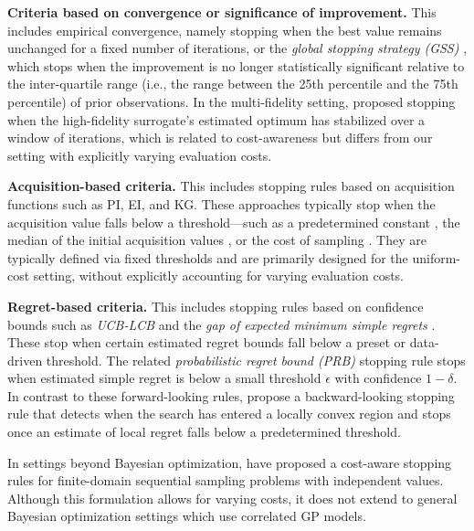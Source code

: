 \textbf{Criteria based on convergence or significance of improvement.} 
This includes empirical convergence, namely stopping when the best value remains unchanged for a fixed number of iterations, or the \emph{global stopping strategy (GSS)} \citep{bakshy2018ae}, which stops when the improvement is no longer statistically significant relative to the inter-quartile range (i.e., the range between the 25th percentile and the 75th percentile) of prior observations.
In the multi-fidelity setting, \citet{FourmaniB25} proposed stopping when the high-fidelity surrogate’s estimated optimum has stabilized over a window of iterations, which is related to cost-awareness but differs from our setting with explicitly varying evaluation costs.

\textbf{Acquisition-based criteria.} This includes stopping rules based on acquisition functions such as PI, EI, and KG. These approaches typically stop when the acquisition value falls below a threshold—such as a predetermined constant \citep{lorenz2015stopping,locatelli1997bayesian}, the median of the initial acquisition values \citep{ishibashi2023stopping}, or the cost of sampling \cite{nguyen2017regret,zhou2024corrected,frazier2008knowledge}. They are typically defined via fixed thresholds and are primarily designed for the uniform-cost setting, without explicitly accounting for varying evaluation costs.

\textbf{Regret-based criteria.} This includes stopping rules based on confidence bounds such as \emph{UCB-LCB} \citep{makarova2022automatic} and the \emph{gap of expected minimum simple regrets} \citep{ishibashi2023stopping}. These stop when certain estimated regret bounds fall below a preset or data-driven threshold. The related \emph{probabilistic regret bound (PRB)} stopping rule \citep{wilson2024stopping} stops when estimated simple regret is below a small threshold $\epsilon$ with confidence $1 - \delta$.
In contrast to these forward-looking rules, \citet{li2023not} propose a backward-looking stopping rule that detects when the search has entered a locally convex region and stops once an estimate of local regret falls below a predetermined threshold.

In settings beyond Bayesian optimization, \citet{chick2012sequential} have proposed a cost-aware stopping rules for finite-domain sequential sampling problems with independent values. 
Although this formulation allows for varying costs, it does not extend to general Bayesian optimization settings which use correlated GP models.
